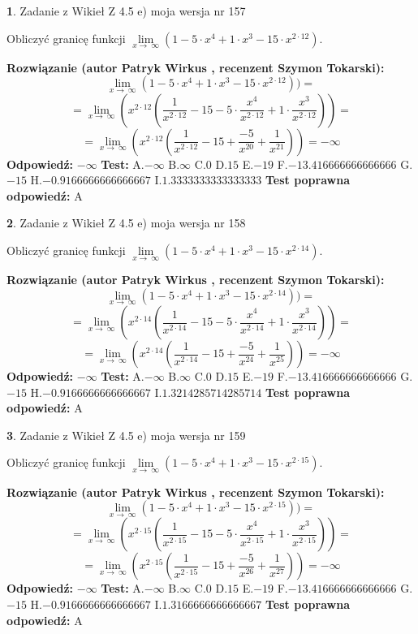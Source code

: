 \documentclass[12pt, a4paper]{article}
\theoremstyle{definition} %
\newtheorem{zad}{}
\newcommand{\zadStart}[1]{\begin{zad}#1\newline}
\newcommand{\zadStop}{\end{zad}}
\newcommand{\rozwStart}[2]{\noindent \textbf{Rozwiązanie (autor #1 , recenzent #2): }\newline}
\newcommand{\rozwStop}{\newline}
\newcommand{\odpStart}{\noindent \textbf{Odpowiedź:}\newline}
\newcommand{\odpStop}{\newline}
\newcommand{\testStart}{\noindent \textbf{Test:}\newline}
\newcommand{\testStop}{\newline}
\newcommand{\kluczStart}{\noindent \textbf{Test poprawna odpowiedź:}\newline}
\newcommand{\kluczStop}{\newline}
\begin{document}
\zadStart{Zadanie z Wikieł Z 4.5 e) moja wersja nr 157}


Obliczyć granicę funkcji  $\lim\limits_{x\to\ \infty}(1 - 5 \cdot x^{4}+1 \cdot x^{3}- 15 \cdot x^{2\cdot12})$.
\zadStop
\rozwStart{Patryk Wirkus}{Szymon Tokarski}
$$\lim\limits_{x\to\ \infty}(1 - 5 \cdot x^{4}+1 \cdot x^{3}- 15 \cdot x^{2\cdot12}))=$$
$$=\lim\limits_{x\to\ \infty}(x^{2\cdot12}(\frac{1}{x^{2\cdot12}}-15 -5 \cdot \frac{x^{4}}{x^{2\cdot12}}+1 \cdot \frac{x^{3}}{x^{2\cdot12}}))=$$
$$=\lim\limits_{x\to\ \infty}(x^{2\cdot12}(\frac{1}{x^{2\cdot12}}-15 + \frac{-5}{x^{20}}+ \frac{1}{x^{21}}))=-\infty$$
\rozwStop
\odpStart
$-\infty$
\odpStop
\testStart
A.$-\infty$ B.$\infty$ C.$0$ D.$15$ E.$-19$
F.$-13.416666666666666$ G.$-15$
H.$-0.9166666666666667$
I.$1.3333333333333333$
\testStop
\kluczStart
A
\kluczStop



\zadStart{Zadanie z Wikieł Z 4.5 e) moja wersja nr 158}


Obliczyć granicę funkcji  $\lim\limits_{x\to\ \infty}(1 - 5 \cdot x^{4}+1 \cdot x^{3}- 15 \cdot x^{2\cdot14})$.
\zadStop
\rozwStart{Patryk Wirkus}{Szymon Tokarski}
$$\lim\limits_{x\to\ \infty}(1 - 5 \cdot x^{4}+1 \cdot x^{3}- 15 \cdot x^{2\cdot14}))=$$
$$=\lim\limits_{x\to\ \infty}(x^{2\cdot14}(\frac{1}{x^{2\cdot14}}-15 -5 \cdot \frac{x^{4}}{x^{2\cdot14}}+1 \cdot \frac{x^{3}}{x^{2\cdot14}}))=$$
$$=\lim\limits_{x\to\ \infty}(x^{2\cdot14}(\frac{1}{x^{2\cdot14}}-15 + \frac{-5}{x^{24}}+ \frac{1}{x^{25}}))=-\infty$$
\rozwStop
\odpStart
$-\infty$
\odpStop
\testStart
A.$-\infty$ B.$\infty$ C.$0$ D.$15$ E.$-19$
F.$-13.416666666666666$ G.$-15$
H.$-0.9166666666666667$
I.$1.3214285714285714$
\testStop
\kluczStart
A
\kluczStop



\zadStart{Zadanie z Wikieł Z 4.5 e) moja wersja nr 159}


Obliczyć granicę funkcji  $\lim\limits_{x\to\ \infty}(1 - 5 \cdot x^{4}+1 \cdot x^{3}- 15 \cdot x^{2\cdot15})$.
\zadStop
\rozwStart{Patryk Wirkus}{Szymon Tokarski}
$$\lim\limits_{x\to\ \infty}(1 - 5 \cdot x^{4}+1 \cdot x^{3}- 15 \cdot x^{2\cdot15}))=$$
$$=\lim\limits_{x\to\ \infty}(x^{2\cdot15}(\frac{1}{x^{2\cdot15}}-15 -5 \cdot \frac{x^{4}}{x^{2\cdot15}}+1 \cdot \frac{x^{3}}{x^{2\cdot15}}))=$$
$$=\lim\limits_{x\to\ \infty}(x^{2\cdot15}(\frac{1}{x^{2\cdot15}}-15 + \frac{-5}{x^{26}}+ \frac{1}{x^{27}}))=-\infty$$
\rozwStop
\odpStart
$-\infty$
\odpStop
\testStart
A.$-\infty$ B.$\infty$ C.$0$ D.$15$ E.$-19$
F.$-13.416666666666666$ G.$-15$
H.$-0.9166666666666667$
I.$1.3166666666666667$
\testStop
\kluczStart
A
\kluczStop
\end{document}
